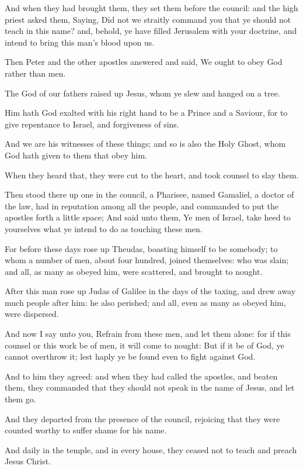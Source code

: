 \verse And when they had brought them, they set them before the council: and the high priest asked them, \verse Saying, Did not we straitly command you that ye should not teach in this name? and, behold, ye have filled Jerusalem with your doctrine, and intend to bring this man's blood upon us.

\verse Then Peter and the other apostles answered and said, We ought to obey God rather than men.

\verse The God of our fathers raised up Jesus, whom ye slew and hanged on a tree.

\verse Him hath God exalted with his right hand to be a Prince and a Saviour, for to give repentance to Israel, and forgiveness of sins.

\verse And we are his witnesses of these things; and so is also the Holy Ghost, whom God hath given to them that obey him.

\verse When they heard that, they were cut to the heart, and took counsel to slay them.

\verse Then stood there up one in the council, a Pharisee, named Gamaliel, a doctor of the law, had in reputation among all the people, and commanded to put the apostles forth a little space; \verse And said unto them, Ye men of Israel, take heed to yourselves what ye intend to do as touching these men.

\verse For before these days rose up Theudas, boasting himself to be somebody; to whom a number of men, about four hundred, joined themselves: who was slain; and all, as many as obeyed him, were scattered, and brought to nought.

\verse After this man rose up Judas of Galilee in the days of the taxing, and drew away much people after him: he also perished; and all, even as many as obeyed him, were dispersed.

\verse And now I say unto you, Refrain from these men, and let them alone: for if this counsel or this work be of men, it will come to nought: \verse But if it be of God, ye cannot overthrow it; lest haply ye be found even to fight against God.

\verse And to him they agreed: and when they had called the apostles, and beaten them, they commanded that they should not speak in the name of Jesus, and let them go.

\verse And they departed from the presence of the council, rejoicing that they were counted worthy to suffer shame for his name.

\verse And daily in the temple, and in every house, they ceased not to teach and preach Jesus Christ.


